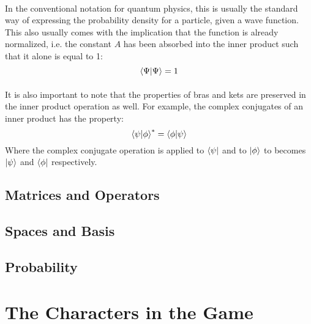 \documentclass[12pt,letterpaper]{book}
\begin{document}
\paragraph*{}In the conventional notation for quantum physics, this is usually the standard way of expressing the probability density for a particle, given a wave function. This also usually comes with the implication that the function is already normalized, i.e. the constant $A$ has been absorbed into the inner product such that it alone is equal to 1:
\begin{equation}
\braket{\Psi}{\Psi} = 1
\end{equation}
\paragraph*{}It is also important to note that the properties of bras and kets are preserved in the inner product operation as well. For example, the complex conjugates of an inner product has the property:
\begin{equation}
\braket{\psi}{\phi}^* = \braket{\phi}{\psi} 
\end{equation}
Where the complex conjugate operation is applied to $\bra{\psi}$ and to $\ket{\phi}$ to becomes $\ket{\psi}$ and $\bra{\phi}$ respectively.



\subsection*{Matrices and Operators}


\subsection*{Spaces and Basis}


\subsection*{Probability}


\section{The Characters in the Game}
\end{document}
